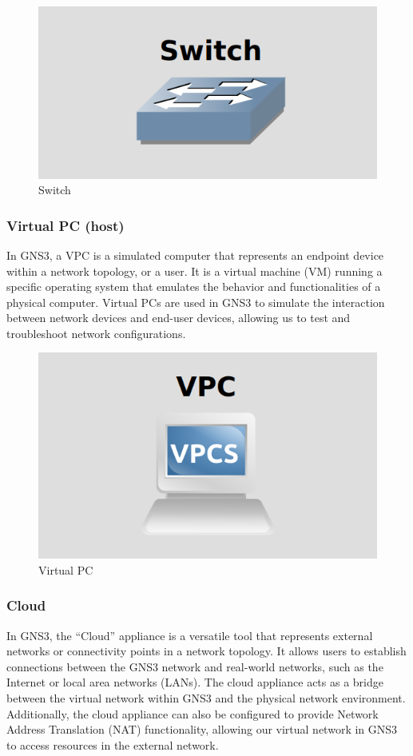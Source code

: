 \begin{figure}[h]
    \centering
    \includegraphics[width=0.4\linewidth]{Images/switch.png}
    \caption{Switch}
    \label{fig:example}
\end{figure}


\subsubsection{Virtual PC (host)}

In GNS3, a \gls{VPC} is a simulated computer that represents an endpoint device within a network topology, or a user. It is a virtual machine (VM) running a specific operating system that emulates the behavior and functionalities of a physical computer. Virtual PCs are used in GNS3 to simulate the interaction between network devices and end-user devices, allowing us to test and troubleshoot network configurations.

\pagebreak

\begin{figure}[h]
    \centering
    \includegraphics[width=0.4\linewidth]{Images/vpc.png}
    \caption{Virtual PC}
    \label{fig:example}
\end{figure}

\subsubsection{Cloud}

In GNS3, the ``Cloud'' appliance is a versatile tool that represents external networks or connectivity points in a network topology. It allows users to establish connections between the GNS3 network and real-world networks, such as the Internet or local area networks (LANs). The cloud appliance acts as a bridge between the virtual network within GNS3 and the physical network environment. Additionally, the cloud appliance can also be configured to provide Network Address Translation (NAT) functionality, allowing our virtual network in GNS3 to access resources in the external network.

